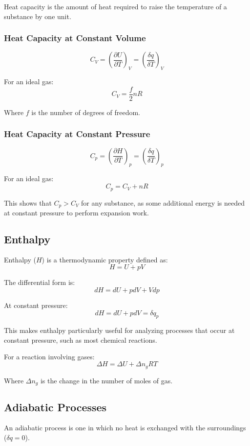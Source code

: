 \documentclass{article}
\theoremstyle{definition}
\begin{document}
Heat capacity is the amount of heat required to raise the temperature of a substance by one unit.

\subsubsection{Heat Capacity at Constant Volume}

\[
C_V = \left(\frac{\partial U}{\partial T}\right)_V = \left(\frac{\delta q}{\delta T}\right)_V
\]

For an ideal gas:
\[
C_V = \frac{f}{2}nR
\]

Where $f$ is the number of degrees of freedom.

\subsubsection{Heat Capacity at Constant Pressure}

\[
C_p = \left(\frac{\partial H}{\partial T}\right)_p = \left(\frac{\delta q}{\delta T}\right)_p
\]

For an ideal gas:
\[
C_p = C_V + nR
\]

This shows that $C_p > C_V$ for any substance, as some additional energy is needed at constant pressure to perform expansion work.

\subsection{Enthalpy}

Enthalpy ($H$) is a thermodynamic property defined as:
\[
H = U + pV
\]

The differential form is:
\[
dH = dU + pdV + Vdp
\]

At constant pressure:
\[
dH = dU + pdV = \delta q_p
\]

This makes enthalpy particularly useful for analyzing processes that occur at constant pressure, such as most chemical reactions.

For a reaction involving gases:
\[
\Delta H = \Delta U + \Delta n_g RT
\]

Where $\Delta n_g$ is the change in the number of moles of gas.

\subsection{Adiabatic Processes}

An adiabatic process is one in which no heat is exchanged with the surroundings ($\delta q = 0$).
\end{document}
